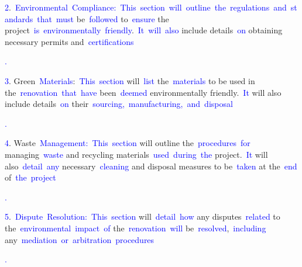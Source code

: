 \documentclass{article}
\begin{document}
\begin{tcolorbox}[colframe=black,colback=white]
{}\textcolor{blue}{2}.\textcolor{blue}{~Environmental}\textcolor{blue}{~Compliance}\textcolor{blue}{:}\textcolor{blue}{~This}\textcolor{blue}{~section}\textcolor{blue}{~will}\textcolor{blue}{~outline}\textcolor{blue}{~the}\textcolor{blue}{~regulations}\textcolor{blue}{~and}\textcolor{blue}{~standards}\textcolor{blue}{~that}\textcolor{blue}{~must} be\textcolor{blue}{~followed} to\textcolor{blue}{~ensure} the project\textcolor{blue}{~is}\textcolor{blue}{~environmentally}\textcolor{blue}{~friendly}.\textcolor{blue}{~It}\textcolor{blue}{~will}\textcolor{blue}{~also} include details\textcolor{blue}{~on} obtaining necessary permits and\textcolor{blue}{~certifications}\textcolor{blue}{.

}\textcolor{blue}{3}. Green\textcolor{blue}{~Materials}:\textcolor{blue}{~This}\textcolor{blue}{~section} will\textcolor{blue}{~list} the\textcolor{blue}{~materials} to be used in the\textcolor{blue}{~renovation}\textcolor{blue}{~that}\textcolor{blue}{~have} been\textcolor{blue}{~deemed} environmentally friendly.\textcolor{blue}{~It} will also include details\textcolor{blue}{~on} their\textcolor{blue}{~sourcing}\textcolor{blue}{,}\textcolor{blue}{~manufacturing}\textcolor{blue}{,}\textcolor{blue}{~and}\textcolor{blue}{~disposal}\textcolor{blue}{.

}\textcolor{blue}{4}. Waste\textcolor{blue}{~Management}\textcolor{blue}{:}\textcolor{blue}{~This}\textcolor{blue}{~section} will outline the\textcolor{blue}{~procedures}\textcolor{blue}{~for} managing\textcolor{blue}{~waste} and recycling materials\textcolor{blue}{~used}\textcolor{blue}{~during}\textcolor{blue}{~the} project.\textcolor{blue}{~It} will also\textcolor{blue}{~detail}\textcolor{blue}{~any} necessary\textcolor{blue}{~cleaning} and disposal measures to be\textcolor{blue}{~taken} at the\textcolor{blue}{~end} of\textcolor{blue}{~the}\textcolor{blue}{~project}\textcolor{blue}{.

}\textcolor{blue}{5}.\textcolor{blue}{~Dis}\textcolor{blue}{pute}\textcolor{blue}{~Resolution}\textcolor{blue}{:}\textcolor{blue}{~This}\textcolor{blue}{~section} will\textcolor{blue}{~detail}\textcolor{blue}{~how} any disputes\textcolor{blue}{~related} to the\textcolor{blue}{~environmental}\textcolor{blue}{~impact}\textcolor{blue}{~of} the\textcolor{blue}{~renovation}\textcolor{blue}{~will} be\textcolor{blue}{~resolved},\textcolor{blue}{~including} any\textcolor{blue}{~mediation}\textcolor{blue}{~or}\textcolor{blue}{~arbitration}\textcolor{blue}{~procedures}\textcolor{blue}{.

}
\end{tcolorbox}
\end{document}
